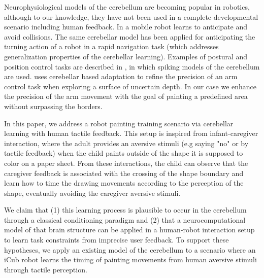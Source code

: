 \documentclass[letterpaper, 10 pt, conference]{ieeeconf}  %
\newcommand\jp[1]{{\color{red}}{\color{red}}{\footnotesize \color{red}[#1 - \textbf{Jordi}]}} %
\begin{document}
Neurophysiological models of the cerebellum are becoming popular in robotics, although to our knowledge, they have not been used in a complete developmental scenario including human feedback. In \cite{hofstoetter2002cerebellum} a mobile robot learns to anticipate and avoid collisions. The same cerebellar model has been applied for anticipating the turning action of a robot in a rapid navigation task  \cite{herreros2013speed} (which addresses generalization properties of the cerebellar learning). Examples of postural and position control tasks are described in \cite{pinzon2015realistic}, in which spiking models of the cerebellum are used. \cite{barron2013cerebellum} uses cerebellar based adaptation to refine the precision of an arm control task when exploring a surface of uncertain depth. In our case we enhance the precision of the arm movement with the goal of painting a predefined area without surpassing the borders.  

In this paper, we address a robot painting training scenario via cerebellar learning with human tactile feedback. This setup is inspired from infant-caregiver interaction, where the adult provides an aversive stimuli (e.g saying "no" or by tactile feedback) when the child paints outside of the shape it is supposed to color on a paper sheet. From these interactions, the child can observe that the caregiver feedback is associated with the crossing of the shape boundary and learn how to time the drawing movements according to the perception of the shape, eventually avoiding the caregiver aversive stimuli. 

We claim that (1) this learning process is plausible to occur in the cerebellum through a classical conditioning paradigm and (2) that a neurocomputational model of that brain structure can be applied in a human-robot interaction setup to learn task constraints from imprecise user feedback. To support these hypotheses, we apply an existing model of the  cerebellum  \cite{herreros2013nucleo} to a scenario where an iCub robot \cite{metta2008icub} learns the timing of painting movements from human aversive stimuli through tactile perception. %
\end{document}
